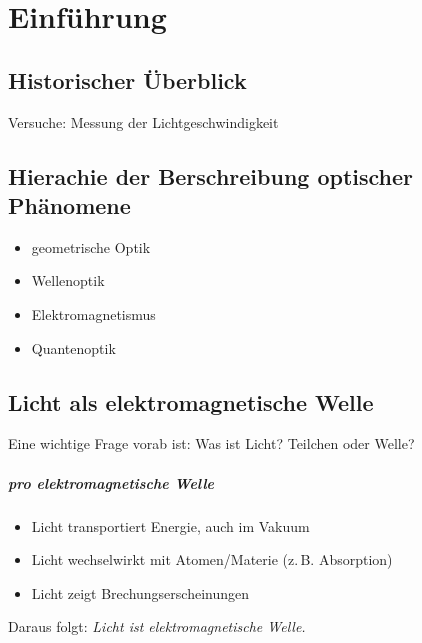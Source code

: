 
\chapter{Einführung}


\section{Historischer Überblick}
\sFolien

Versuche: Messung der Lichtgeschwindigkeit

\section{Hierachie der Berschreibung optischer Phänomene}
\begin{itemize}
\item geometrische Optik
\item Wellenoptik
\item Elektromagnetismus
\item Quantenoptik
\end{itemize}

\section{Licht als elektromagnetische Welle}
Eine wichtige Frage vorab ist:
Was ist Licht? Teilchen oder Welle?

\paragraph*{pro elektromagnetische Welle}
\begin{itemize}
\item Licht transportiert Energie, auch im Vakuum
\item Licht wechselwirkt mit Atomen/Materie (z.\,B. Absorption)
\item Licht zeigt Brechungserscheinungen
\end{itemize}
Daraus folgt: \emph{Licht ist elektromagnetische Welle.}

